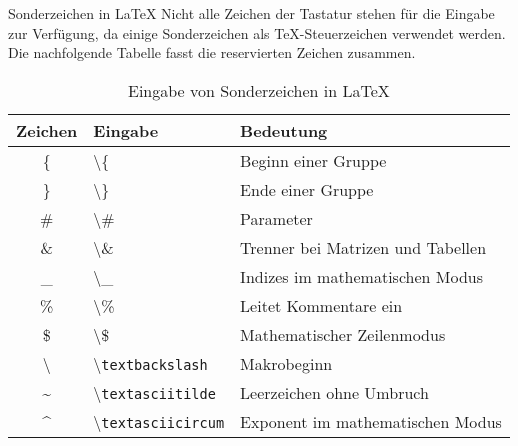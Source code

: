 \begin{frame}{Sonderzeichen in \LaTeX}
Nicht alle Zeichen der Tastatur stehen für die Eingabe zur Verfügung, da einige Sonderzeichen als \TeX{}-Steuerzeichen verwendet werden. Die nachfolgende Tabelle fasst die reservierten Zeichen zusammen.
\begin{table}
\caption{Eingabe von Sonderzeichen in \LaTeX}
	\begin{tabular}{cll}
		\hline
		Zeichen & Eingabe & Bedeutung \\
		\hline
		\{ & \textbackslash\{ & Beginn einer Gruppe \\
		\} & \textbackslash\} & Ende einer Gruppe \\
		\# & \textbackslash\# & Parameter \\
		\& & \textbackslash\& & Trenner bei Matrizen und Tabellen \\
		\_ & \textbackslash\_ & Indizes im mathematischen Modus \\
		\% & \textbackslash\% & Leitet Kommentare ein \\
		\$ & \textbackslash\$ & Mathematischer Zeilenmodus \\
		\textbackslash & \textbackslash\texttt{textbackslash} & Makrobeginn \\
		\textasciitilde & \textbackslash\texttt{textasciitilde} & Leerzeichen ohne Umbruch \\
	    \textasciicircum & \textbackslash\texttt{textasciicircum} & Exponent im mathematischen Modus \\
		\hline
	\end{tabular}
\end{table}
\end{frame}